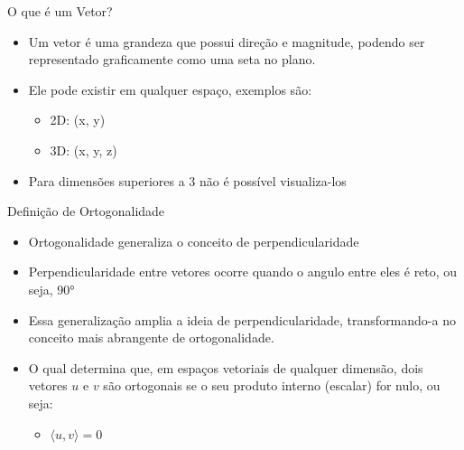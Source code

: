 \documentclass{beamer}
\begin{document}
\begin{frame}{O que é um Vetor?}


\begin{itemize}
    \item Um vetor é uma grandeza que possui direção e magnitude, podendo ser representado graficamente como uma seta no plano.
    \item Ele pode existir em qualquer espaço, exemplos são:
    \begin{itemize}
        \item 2D: (x, y)
        \item 3D: (x, y, z)
    \end{itemize}
    \item Para dimensões superiores a 3 não é possível visualiza-los
\end{itemize}

\end{frame}
\begin{frame}{Definição de Ortogonalidade}


\vspace{0.5cm}

\begin{itemize}
    \item Ortogonalidade generaliza o conceito de perpendicularidade
    \item Perpendicularidade entre vetores ocorre quando o angulo entre eles é reto, ou seja, 90° 
    \item Essa generalização amplia a ideia de perpendicularidade, transformando-a no conceito mais abrangente de ortogonalidade. 
    \item O qual determina que, em espaços vetoriais de qualquer dimensão, dois vetores $u$ e $v$ são ortogonais se o seu produto interno (escalar) for nulo, ou seja:
    \begin{itemize}
        \item $\langle u, v \rangle = 0$
    \end{itemize}
\end{itemize}

\vspace{0.5cm}

\end{frame}
\end{document}
